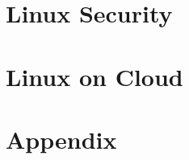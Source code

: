 








\part{Linux Security}




\part{Linux on Cloud}







\part{Appendix}






\printindex


